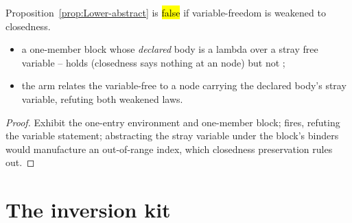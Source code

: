 \begin{lemma}
\label{lem:FVarFixture-noFVar_needs_fvarFree}
\leanok
{}
 Proposition~\ref{prop:Lower-abstract} is \hl{false} if variable-freedom is weakened to
closedness.
\begin{itemize}
\item {} a one-member block whose \emph{declared} body is a lambda over a stray free variable
--  holds (closedness says nothing at an  node) but not
;
\item {} the  arm relates the variable-free  to a  node
carrying the declared body's stray variable, refuting both weakened laws.
\end{itemize}
\end{lemma}
\begin{proof}
\leanok
{}
 Exhibit the one-entry environment and one-member block;  fires, refuting the
variable statement; abstracting the stray variable under the block's binders would manufacture an
out-of-range index, which closedness preservation rules out.
\end{proof}

\section{The inversion kit}
\label{sec:lowering:inversion}

